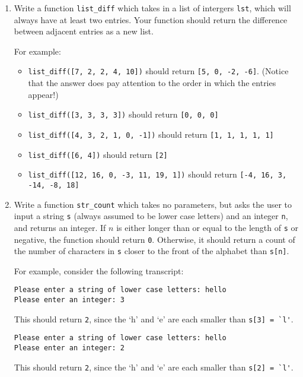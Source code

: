 \documentclass{article}
\begin{document}
\begin{enumerate}
\item Write a function \verb|list_diff| which takes in a list of intergers \verb|lst|, which will always have at least two entries. Your function should return the difference between adjacent entries as a new list.

    For example:

    \begin{itemize}
      \item \verb|list_diff([7, 2, 2, 4, 10])| should return \verb|[5, 0, -2, -6]|. (Notice that the answer does pay attention to the order in which the entries appear!)
      \item \verb|list_diff([3, 3, 3, 3])| should return \verb|[0, 0, 0]|
      \item \verb|list_diff([4, 3, 2, 1, 0, -1])| should return \verb|[1, 1, 1, 1, 1]|
      \item \verb|list_diff([6, 4])| should return \verb|[2]|
      \item \verb|list_diff([12, 16, 0, -3, 11, 19, 1])| should return \verb|[-4, 16, 3, -14, -8, 18]|
    \end{itemize}


\item Write a function \verb|str_count| which takes no parameters, but asks the user to input a string \verb|s| (always assumed to be lower case letters) and an integer \verb|n|, and returns an integer. If $n$ is either longer than or equal to the length of \verb|s| or negative, the function should return \verb|0|. Otherwise, it should return a count of the number of characters in \verb|s| closer to the front of the alphabet than \verb|s[n]|.

For example, consider the following transcript:

\begin{verbatim}
Please enter a string of lower case letters: hello
Please enter an integer: 3
\end{verbatim}
This should return \verb|2|, since the `h' and `e' are each smaller than \verb|s[3] = `l'|.

\vspace{0.15in}

\begin{verbatim}
Please enter a string of lower case letters: hello
Please enter an integer: 2
\end{verbatim}
This should return \verb|2|, since the `h' and `e' are each smaller than \verb|s[2] = `l'|.


\end{enumerate}
\end{document}

